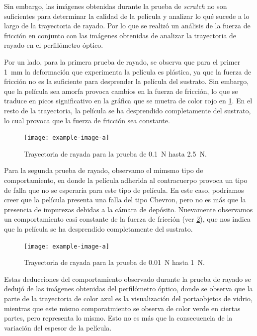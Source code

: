 \documentclass[12pt]{IEEEtran}
\begin{document}
Sin embargo, las imágenes obtenidas durante la prueba de \emph{scratch} no son suficientes para determinar la calidad de la película y analizar lo qué sucede a lo largo de la trayectoria de rayado. Por lo que se realizó un análisis de la fuerza de fricción en conjunto con las imágenes obtenidas de analizar la trayectoria de rayado en el perfilómetro óptico.

Por un lado, para la primera prueba de rayado, se observa que para el primer \qty{1}{\mm} la deformación que experimenta la película es plástica, ya que la fuerza de fricción no es la suficiente para desprender la película del sustrato. Sin embargo, que la película sea amorfa provoca cambios en la fuerza de fricción, lo que se traduce en picos significativo en la gráfica que se muetra de color rojo en \cref{fig:scratch-test-1}. En el resto de la trayectoria, la película se ha desprendido completamente del sustrato, lo cual provoca que la fuerza de fricción sea constante.

\begin{figure}[htb]
	\centering
	\texttt{[image: example-image-a]}
	\caption{Trayectoria de rayada para la prueba de \qty{0.1}{\N} hasta \qty{2.5}{\N}.}
	\label{fig:scratch-test-1}
\end{figure}%

Para la segunda prueba de rayado, observamo el mimsmo tipo de comportamiento, en donde la película adherida al contracuerpo provoca un tipo de falla que no se esperaría para este tipo de película. En este caso, podríamos creer que la película presenta una falla del tipo Chevron, pero no es más que la presencia de impurezas debidas a la cámara de depósito. Nuevamente observamos un comportamiento casi constante de la fuerza de fricción (ver \cref{fig:scratch-test-2}), que nos indica que la película se ha desprendido completamente del sustrato.

\begin{figure}[htb]
	\centering
	\texttt{[image: example-image-a]}
	\caption{Trayectoria de rayada para la prueba de \qty{0.01}{\N} hasta \qty{1}{\N}.}
	\label{fig:scratch-test-2}
\end{figure}

Estas deducciones del comportamiento observado durante la prueba de rayado se dedujó de las imágenes obtenidas del perfilómetro óptico, donde se observa que la parte de la trayectoria de color azul es la visualización del portaobjetos de vidrio, mientras que este mismo comporatmiento se observa de color verde en ciertas partes, pero representa lo mismo. Esto no es más que la consecuencia de la variación del espesor de la película.
\end{document}
